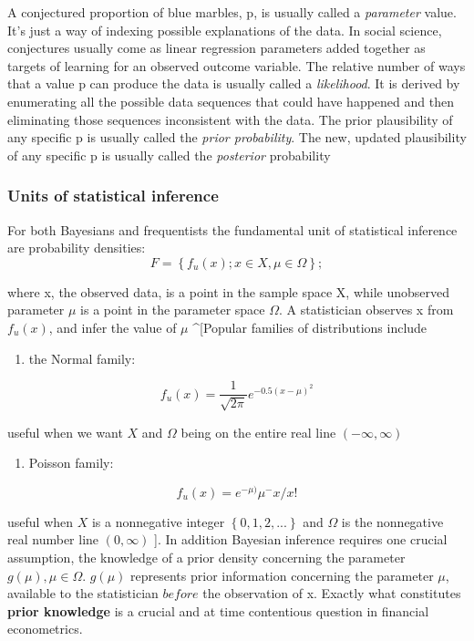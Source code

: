 \documentclass{article}
\begin{document}
A conjectured proportion of blue marbles, p, is usually called a
\emph{parameter} value. It's just a way of indexing possible
explanations of the data. In social science, conjectures usually come as
linear regression parameters added together as targets of learning for
an observed outcome variable. The relative number of ways that a value p
can produce the data is usually called a \emph{likelihood}. It is
derived by enumerating all the possible data sequences that could have
happened and then eliminating those sequences inconsistent with the
data. The prior plausibility of any specific p is usually called the
\emph{prior probability}. The new, updated plausibility of any specific
p is usually called the \emph{posterior} probability

\hypertarget{units-of-statistical-inference}{%
\subsubsection{Units of statistical
inference}\label{units-of-statistical-inference}}

For both Bayesians and frequentists the fundamental unit of statistical
inference are probability densities:
\[F=\left\{f_u(x);x \in X,\mu \in \Omega \right\};\]

where x, the observed data, is a point in the sample space X, while
unobserved parameter \(\mu\) is a point in the parameter space
\(\Omega\). A statistician observes x from \(f_u(x)\), and infer the
value of \(\mu\) \^{}{[}Popular families of distributions include

\begin{enumerate}
\def\labelenumi{\arabic{enumi}.}
\tightlist
\item
  the Normal family:
\end{enumerate}

\[f_u(x)=\frac{1}{\sqrt{2 \pi}} e^{-0.5(x-\mu)^2}\]

useful when we want \(X\) and \(\Omega\) being on the entire real line
\((-\infty,\infty)\)

\begin{enumerate}
\def\labelenumi{\arabic{enumi}.}
\setcounter{enumi}{1}
\tightlist
\item
  Poisson family:
\end{enumerate}

\[f_u(x)=e^{-\mu)}\mu^-x/x!\]

useful when \(X\) is a nonnegative integer \(\left\{0,1,2,...\right\}\)
and \(\Omega\) is the nonnegative real number line \((0,\infty)\) {]}.
In addition Bayesian inference requires one crucial assumption, the
knowledge of a prior density concerning the parameter
\(g(\mu),\mu \in \Omega\). \(g(\mu)\) represents prior information
concerning the parameter \(\mu\), available to the statistician
\(before\) the observation of x. Exactly what constitutes \textbf{prior
knowledge} is a crucial and at time contentious question in financial
econometrics.
\end{document}
